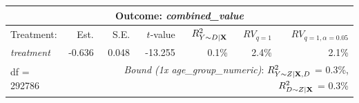 \begin{table}[!h]
\centering
\begin{tabular}{lrrrrrr}
\multicolumn{7}{c}{Outcome: \textit{combined_value}} \\
\hline \hline 
Treatment: & Est. & S.E. & $t$-value & $R^2_{Y \sim D |{\bf X}}$ & $RV_{q = 1}$ & $RV_{q = 1, \alpha = 0.05}$  \\ 
\hline 
\textit{treatment} & -0.636 & 0.048 & -13.255 & 0.1\% & 2.4\% & 2.1\% \\ 
\hline 
df = 292786 & & \multicolumn{5}{r}{ \small \textit{Bound (1x age_group_numeric)}: $R^2_{Y\sim Z| {\bf X}, D}$ = 0.3\%, $R^2_{D\sim Z| {\bf X} }$ = 0.3\%} \\
\end{tabular}
\end{table}
